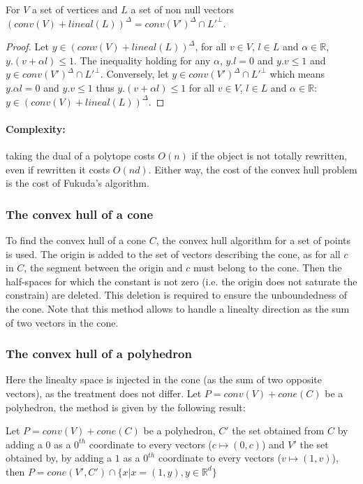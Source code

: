 \begin{proposition}
For $V$ a set of vertices and $L$ a set of non null vectors $(conv(V)+lineal(L))^\Delta = conv(V')^\Delta \cap L'^\bot$. 
\label{prop_lineal_dual}
\end{proposition}
\begin{proof}
Let $y\in (conv(V)+lineal(L))^\Delta$, for all $v\in V$, $l \in L$ and $\alpha\in\mathbb{R}$, $y.(v+\alpha l)\leq 1$. The inequality holding for any $\alpha$,  $y.l=0$ and $y.v\leq 1$ and $y\in conv(V')^\Delta \cap L'^\bot$. Conversely, let $y \in conv(V')^\Delta \cap L'^\bot$ which means $y.\alpha l=0$ and $y.v\leq 1$ thus $y.(v+\alpha l)\leq 1$ for all $v\in V$, $l \in L$ and $\alpha\in\mathbb{R}$: $y\in (conv(V)+lineal(L))^\Delta$.
\end{proof}

\paragraph{Complexity:} taking the dual of a polytope costs $O(n)$ if the object is not totally rewritten, even if rewritten it costs $O(nd)$. Either way, the cost of the convex hull problem is the cost of Fukuda's algorithm.

\subsubsection{The convex hull of a cone}\label{ss_conehull}
To find the convex hull of a cone $C$, the convex hull algorithm for a set of points is used.
The origin is added to the set of vectors describing the cone, as for all $c$ in $C$, the segment between the origin and $c$ must belong to the cone. Then the half-spaces for which  the constant is not zero (i.e. the origin does not saturate the constrain) are deleted. This deletion is required to ensure the unboundedness of the cone. Note that this method allows to handle a linealty direction as the sum of two vectors in the cone.

\subsubsection{The convex hull of a polyhedron}
Here the linealty space is injected in the cone (as the sum of two opposite vectors), as the treatment does not differ. Let $P=conv(V) + cone(C)$ be a polyhedron, the method is given by the following result:
\begin{proposition}
Let $P=conv(V) + cone(C)$ be a polyhedron, $C'$ the set obtained from $C$ by adding a $0$ as a $0^{th}$ coordinate to every vectors ($c \mapsto (0,c)$) and $V'$ the set obtained by, by adding a $1$ as a $0^{th}$ coordinate to every vectors ($v \mapsto (1,v)$), then $P=cone(V',C')\cap \{ x| x= (1,y), y\in \mathbb{R}^d \}$
\end{proposition}

